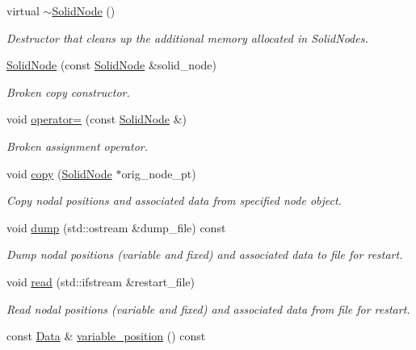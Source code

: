 \begin{DoxyCompactItemize}
virtual \hyperlink{classoomph_1_1SolidNode_a8dd2dcdf8f2585a30da22e391fcb7888}{$\sim$\+Solid\+Node} ()
\begin{DoxyCompactList}\small\item\em Destructor that cleans up the additional memory allocated in Solid\+Nodes. \end{DoxyCompactList}\item 
\hyperlink{classoomph_1_1SolidNode_ad482755fd691e0888768e99d1c422439}{Solid\+Node} (const \hyperlink{classoomph_1_1SolidNode}{Solid\+Node} \&solid\+\_\+node)
\begin{DoxyCompactList}\small\item\em Broken copy constructor. \end{DoxyCompactList}\item 
void \hyperlink{classoomph_1_1SolidNode_ab62f67b20caf5db02a81d794a32f049b}{operator=} (const \hyperlink{classoomph_1_1SolidNode}{Solid\+Node} \&)
\begin{DoxyCompactList}\small\item\em Broken assignment operator. \end{DoxyCompactList}\item 
void \hyperlink{classoomph_1_1SolidNode_ae4dfa5355b84b58745b0c6a3fef60112}{copy} (\hyperlink{classoomph_1_1SolidNode}{Solid\+Node} $\ast$orig\+\_\+node\+\_\+pt)
\begin{DoxyCompactList}\small\item\em Copy nodal positions and associated data from specified node object. \end{DoxyCompactList}\item 
void \hyperlink{classoomph_1_1SolidNode_aad56eb7d55fcd10b3aaa34c5b4ab9f6a}{dump} (std\+::ostream \&dump\+\_\+file) const
\begin{DoxyCompactList}\small\item\em Dump nodal positions (variable and fixed) and associated data to file for restart. \end{DoxyCompactList}\item 
void \hyperlink{classoomph_1_1SolidNode_ac4614b9f9c2222cb40cb004f85a66e57}{read} (std\+::ifstream \&restart\+\_\+file)
\begin{DoxyCompactList}\small\item\em Read nodal positions (variable and fixed) and associated data from file for restart. \end{DoxyCompactList}\item 
const \hyperlink{classoomph_1_1Data}{Data} \& \hyperlink{classoomph_1_1SolidNode_a5142f381e58a87e20c7292aebdd7cc19}{variable\+\_\+position} () const

\end{DoxyCompactItemize}
